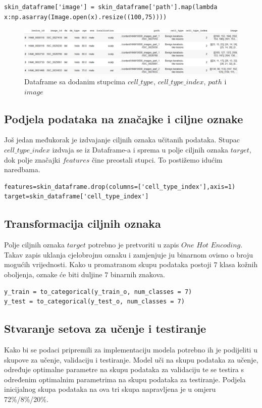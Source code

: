 \documentclass[times, utf8, zavrsni]{fer}
\begin{document}
\begin{verbatim}
skin_dataframe['image'] = skin_dataframe['path'].map(lambda x:np.asarray(Image.open(x).resize((100,75))))
\end{verbatim}
%
\begin{figure}[!h]
\hspace{-0.1\textwidth}
\includegraphics[width=1.2\textwidth]{./slike/dataframe}
\caption{Dataframe sa dodanim stupcima $cell\_type$, $cell\_type\_index$, $path$ i $image$}
\label{fig:dataframe}
\end{figure}
%

\subsection*{Podjela podataka na značajke i ciljne oznake}
Još jedan međukorak je izdvajanje ciljnih oznaka učitanih podataka. Stupac $cell\_type\_index$ izdvaja se iz Dataframe-a i sprema u polje ciljnih oznaka $target$, dok polje značajki $features$ čine preostali stupci. To postižemo idućim naredbama.

\begin{verbatim}
features=skin_dataframe.drop(columns=['cell_type_index'],axis=1)
target=skin_dataframe['cell_type_index']
\end{verbatim}

\subsection*{Transformacija ciljnih oznaka}

Polje ciljnih oznaka $target$ potrebno je pretvoriti u zapis $One$ $Hot$ $Encoding$. Takav zapis uklanja cjelobrojnu oznaku i zamjenjuje ju binarnom ovisno o broju mogućih vrijednosti. Kako u promatranom skupu podataka postoji $7$ klasa kožnih oboljenja, oznake će biti duljine $7$ binarnih znakova.

\begin{verbatim}
y_train = to_categorical(y_train_o, num_classes = 7)
y_test = to_categorical(y_test_o, num_classes = 7)
\end{verbatim}

\subsection*{Stvaranje setova za učenje i testiranje}
Kako bi se podaci pripremili za implementaciju modela potrebno ih je podijeliti u skupove za učenje, validaciju i testiranje. Model uči na skupu podataka za učenje, određuje optimalne parametre na skupu podataka za validaciju te se testira s određenim optimalnim parametrima na skupu podataka za testiranje. Podjela inicijalnog skupa podataka na ova tri skupa napravljena je u omjeru 72\%/8\%/20\%. 
\end{document}
